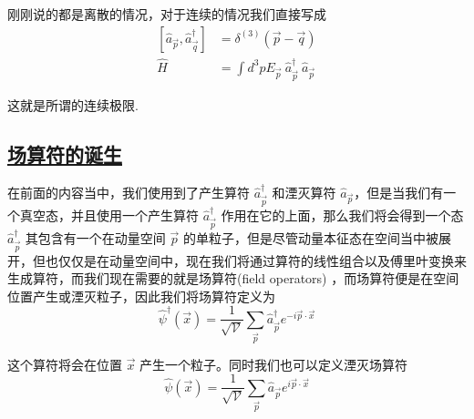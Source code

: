 刚刚说的都是离散的情况，对于连续的情况我们直接写成
\begin{align*}
    \left[\hat{a}_{\vec{p}},\hat{a}_{\vec{q}}^\dagger\right] &= \delta^{(3)}\left(\vec{p} - \vec{q}\right) \\
    \hat{H} &= \int d^3p E_{\vec{p}} \  \hat{a}_{\vec{p}}^\dagger \  \hat{a}_{\vec{p}}
\end{align*}

这就是所谓的连续极限.



\subsection{\protect\hyperlink{:}{场算符的诞生}}

在前面的内容当中，我们使用到了产生算符 $\hat{a}_{\vec{p}}^\dagger$ 和湮灭算符 $\hat{a}_{\vec{p}}$，但是当我们有一个真空态，并且使用一个产生算符 $\hat{a}_{\vec{p}}^\dagger$ 作用在它的上面，那么我们将会得到一个态 $\hat{a}_{\vec{p}}^\dagger$ 其包含有一个在动量空间 $\vec{p}$ 的单粒子，但是尽管动量本征态在空间当中被展开，但也仅仅是在动量空间中，现在我们将通过算符的线性组合以及傅里叶变换来生成算符，而我们现在需要的就是场算符(field operators) ，而场算符便是在空间位置产生或湮灭粒子，因此我们将场算符定义为
\begin{equation*}
    \hat{\psi}^\dagger (\vec{x}) = \frac{1}{\sqrt{\mathcal{V}}}\sum_{\vec{p}} \hat{a}_{\vec{p}}^\dagger e^{-i\vec{p}\cdot \vec{x}}
\end{equation*}

这个算符将会在位置 $\vec{x}$ 产生一个粒子。同时我们也可以定义湮灭场算符
\begin{equation*}
    \hat{\psi} (\vec{x}) = \frac{1}{\sqrt{\mathcal{V}}}\sum_{\vec{p}} \hat{a}_{\vec{p}} e^{i\vec{p}\cdot \vec{x}}
\end{equation*}

